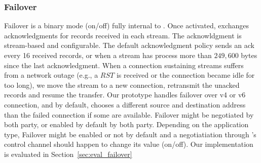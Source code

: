 \subsubsection{Failover}\label{failover}
Failover is a binary mode (on/off) fully internal to \tcpls. Once activated,
\tcpls exchanges acknowledgments for records received in each stream. The
acknowldgment is stream-based and configurable. The default acknowledgment
policy sends an ack every 16 received records, or when a stream has process more
than $249,600$ bytes since the last acknowledgment.  When a \tcp connection
sustaining \tcpls streams suffers from a network outage (e.g., a $RST$ is
received or the connection became idle for too long), we move the stream to a
new \tcp connection, retransmit the unacked records and resume the transfer. Our
prototype handles failover over v4 or v6 \tcp connection, and by default,
chooses a different source and destination address than the failed \tcp
connection if some are available. Failover might be negotiated by both party, or
enabled by default by both party. Depending on the application type, Failover
might be enabled or not by default and a negotiatiation through \tcpls's control
channel should happen to change its value (on/off). Our implementation is
evaluated in Section~\ref{sec:eval_failover}





